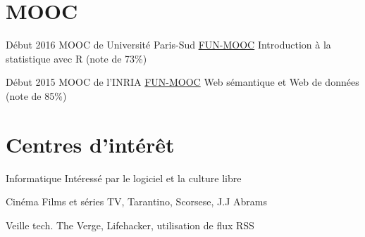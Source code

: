 \documentclass[letterpaper]{twentysecondcv} %
\begin{document}
\section{MOOC}

\begin{twenty}
    
    \twentyitem
    	{Début 2016}
        {MOOC de Université Paris-Sud}
        {\href{http://www.fun-mooc.fr/courses/UPSUD/42001S06/session06/about}{FUN-MOOC}}
        {}
        {
        {Introduction à la statistique avec R (note de 73\%)}
        }
        
    \twentyitem
    	{Début 2015}
        {MOOC de l’INRIA}
        {\href{https://www.fun-mooc.fr}{FUN-MOOC}}
        {}
        {
        {Web sémantique et Web de données (note de 85\%)}
        }

\end{twenty}

\section{Centres d'intérêt}

\begin{twenty}    
    \twentyitem
    	{Informatique}
    	{}
    	{}
        {Intéressé par le logiciel et la culture libre}
        {}
	
	  \twentyitem
    	{Cinéma}
    	{}
    	{}
        {Films et séries TV, Tarantino, Scorsese, J.J Abrams}
        {}
        
     \twentyitem
    	{Veille tech.}
    	{}
    	{}
        {The Verge, Lifehacker, utilisation de flux RSS}
        {}


        
       
        

\end{twenty}
\end{document}
